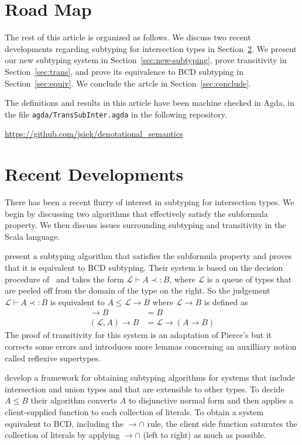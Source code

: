 \documentclass{article}
\begin{document}
\section{Road Map}
\label{sec:road-map}

The rest of this article is organized as follows. We discuss two
recent developments regarding subtyping for intersection types in
Section~\ref{sec:recent-developments}.  We present our new subtyping
system in Section~\ref{sec:new-subtyping}, prove transitivity in
Section~\ref{sec:trans}, and prove its equivalence to BCD subtyping in
Section~\ref{sec:equiv}. We conclude the artcle in
Section~\ref{sec:conclude}.

The definitions and results in this article have been machine checked
in Agda, in the file \texttt{agda/TransSubInter.agda} in the following
repository.

\begin{center}
  \url{https://github.com/jsiek/denotational_semantics}
\end{center}

\section{Recent Developments}
\label{sec:recent-developments}

There has been a recent flurry of interest in subtyping for
intersection types. We begin by discussing two algorithms that
effectively satisfy the subformula property. We then discuss issues
surrounding subtyping and transitivity in the Scala language.

\citet{Bi:2018aa} present a subtyping algorithm that satisfies the
subformula property and proves that it is equivalent to BCD
subtyping. Their system is based on the decision procedure
of~\citet{Pierce:1989aa} and takes the form $\mathcal{L} \vdash A
\prec: B$, where $\mathcal{L}$ is a queue of types that are peeled off
from the domain of the type on the right. So the judgement
$\mathcal{L} \vdash A \prec: B$ is equivalent to $A \leq \mathcal{L}
\to B$ where $\mathcal{L} \to B$ is defined as
\begin{align*}
  [] \to B &= B\\
  (\mathcal{L},A) \to B &= \mathcal{L} \to (A \to B)
\end{align*}
The proof of transitivity for this system is an adaptation of Pierce's
but it corrects some errors and introduces more lemmas concerning an
auxilliary notion called reflexive supertypes.

\citet{Muehlboeck:2018aa} develop a framework for obtaining subtyping
algorithms for systems that include intersection and union types and
that are extensible to other types. To decide $A \leq B$ their
algorithm converts $A$ to disjunctive normal form and then applies a
client-supplied function to each collection of literals. To obtain a
system equivalent to BCD, including the ${\to}{\cap}$ rule, the client
side function saturates the collection of literals by applying
${\to}{\cap}$ (left to right) as much as possible.
\end{document}
